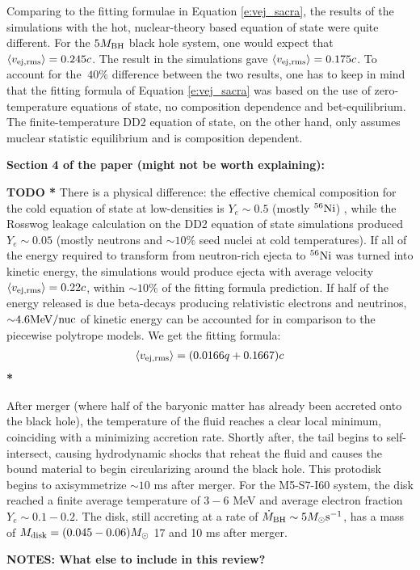 Comparing to the fitting formulae in Equation \ref{e:vej_sacra}, the results of the simulations with the hot, nuclear-theory based equation of state were quite different.  For the $5 M_{\rm BH}$ black hole system, one would expect that 
$\left\langle v_{\rm ej, rms} \right\rangle = 0.245 c$.  The result in the \SpEC simulations gave $\left\langle v_{\rm ej, rms} \right\rangle = 0.175 c$.  To account for the $~40 \%$ difference between the two results, one has to keep in mind that the fitting formula of  Equation \ref{e:vej_sacra} was based on the use of zero-temperature equations of state, no composition dependence and bet-equilibrium.  The finite-temperature DD2 equation of state, on the other hand, only assumes muclear statistic equilibrium and is composition dependent.  

\textbf{Section 4 of the paper (might not be worth explaining): }

\textbf{TODO * }There is a physical difference: the effective chemical composition for the cold equation of state at low-densities is $Y_e \sim 0.5$ (mostly $^{56}{\rm Ni}$) , while the Rosswog leakage calculation on the DD2 equation of state simulations produced $Y_e \sim 0.05$ (mostly neutrons and $\sim 10\%$ seed nuclei at cold temperatures).
If all of the energy required to transform from neutron-rich ejecta to $^{56}{\rm Ni}$ was turned into kinetic energy, the simulations would produce ejecta with average velocity $\left\langle v_{\rm ej, rms} \right\rangle = 0.22 c$, within $\sim 10\%$ of the fitting formula prediction.
If half of the energy released is due beta-decays producing relativistic electrons and neutrinos, $\mathord{\sim} 4.6 {\rm MeV/nuc}$ of kinetic energy can be accounted for in comparison to the piecewise polytrope models.
We get the fitting formula:
\begin{align}
\label{e:vej_spec}
\left\langle v_{\rm ej, rms} \right\rangle = (0.0166 q + 0.1667) c
\end{align}
 \textbf{ * }


After merger (where half of the baryonic matter has already been accreted onto the black hole), the temperature of the fluid reaches a clear local minimum, coinciding with a minimizing accretion rate.  Shortly after, the tail begins to self-intersect, causing hydrodynamic shocks that reheat the fluid and causes the bound material to begin circularizing around the black hole.  
This protodisk begins to axisymmetrize $\sim 10$ ms after merger.  
For the M5-S7-I60 system, the disk reached a finite average temperature of $3 - 6$ MeV and average electron fraction $Y_e \sim 0.1 - 0.2$.  The disk, still accreting at a rate of $\dot{M}_{\rm BH} \sim 5 M_\odot {\rm s}^{-1}$, has a mass of $M_{\rm disk} = (0.045 - 0.06) M_\odot$ 17 and 10 ms after merger.


\textbf{NOTES: What else to include in this review?}  